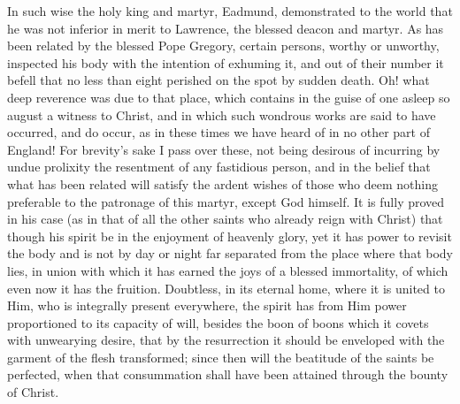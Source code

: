 \documentclass[10pt]{book}
\begin{document}
\begin{paracol}{2}
\switchcolumn

In such wise the holy king and martyr, Eadmund, demonstrated to the world that he was not inferior in merit to Lawrence, the blessed deacon and martyr. As has been related by the blessed Pope Gregory, certain persons, worthy or unworthy, inspected his body with the intention of exhuming it, and out of their number it befell that no less than eight perished on the spot by sudden death. Oh! what deep reverence was due to that place, which contains in the guise of one asleep so august a witness to Christ, and in which such wondrous works are said to have occurred, and do occur, as in these times we have heard of in no other part of England! For brevity's sake I pass over these, not being desirous of incurring by undue prolixity the resentment of any fastidious person, and in the belief that what has been related will satisfy the ardent wishes of those who deem nothing preferable to the patronage of this martyr, except God himself. It is fully proved in his case (as in that of all the other saints who already reign with Christ) that though his spirit be in the enjoyment of heavenly glory, yet it has power to revisit the body and is not by day or night far separated from the place where that body lies, in union with which it has earned the joys of a blessed immortality, of which even now it has the fruition. Doubtless, in its eternal home, where it is united to Him, who is integrally present everywhere, the spirit has from Him power proportioned to its capacity of will, besides the boon of boons which it covets with unwearying desire, that by the resurrection it should be enveloped with the garment of the flesh transformed; since then will the beatitude of the saints be perfected, when that consummation shall have been attained through the bounty of Christ.

\switchcolumn*


\end{paracol}
\end{document}
